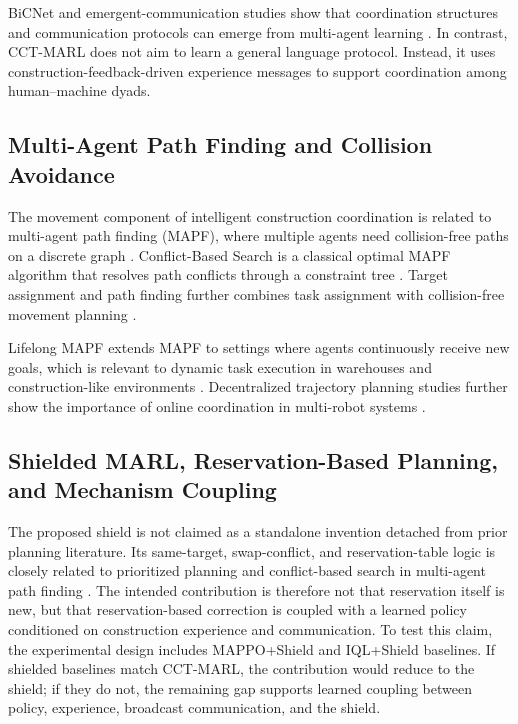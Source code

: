 \documentclass[fleqn,10pt]{wlpeerj}
\begin{document}
BiCNet and emergent-communication studies show that coordination structures and communication protocols can emerge from multi-agent learning \cite{Peng2017BiCNet,Mordatch2018EmergentLanguage}. In contrast, CCT-MARL does not aim to learn a general language protocol. Instead, it uses construction-feedback-driven experience messages to support coordination among human--machine dyads.

\subsection{Multi-Agent Path Finding and Collision Avoidance}

The movement component of intelligent construction coordination is related to multi-agent path finding (MAPF), where multiple agents need collision-free paths on a discrete graph \cite{Stern2019MAPF}. Conflict-Based Search is a classical optimal MAPF algorithm that resolves path conflicts through a constraint tree \cite{Sharon2015CBS}. Target assignment and path finding further combines task assignment with collision-free movement planning \cite{MaKoenig2016TAPF}.

Lifelong MAPF extends MAPF to settings where agents continuously receive new goals, which is relevant to dynamic task execution in warehouses and construction-like environments \cite{Li2021LifelongMAPF}. Decentralized trajectory planning studies further show the importance of online coordination in multi-robot systems \cite{Cap2015DecentralizedPlanning}.

\subsection{Shielded MARL, Reservation-Based Planning, and Mechanism Coupling}

The proposed shield is not claimed as a standalone invention detached from prior planning literature. Its same-target, swap-conflict, and reservation-table logic is closely related to prioritized planning and conflict-based search in multi-agent path finding \cite{Sharon2015CBS,Stern2019MAPF,Li2021LifelongMAPF}. The intended contribution is therefore not that reservation itself is new, but that reservation-based correction is coupled with a learned policy conditioned on construction experience and communication. To test this claim, the experimental design includes MAPPO+Shield and IQL+Shield baselines. If shielded baselines match CCT-MARL, the contribution would reduce to the shield; if they do not, the remaining gap supports learned coupling between policy, experience, broadcast communication, and the shield.
\end{document}
